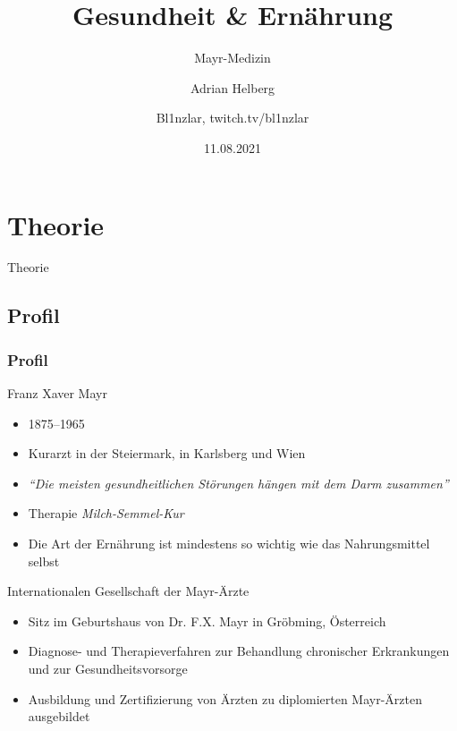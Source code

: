 \documentclass[xcolor=dvipsnames]{beamer}
\title{Gesundheit \& Ernährung}
\subtitle{Mayr-Medizin}
\author{Adrian Helberg}
\author{Bl1nzlar, twitch.tv/bl1nzlar}
\date{11.08.2021}
\begin{document}
    \maketitle


    \section{Theorie}
    {
    \begin{frame}
        \begin{center}
            \Huge Theorie
        \end{center}
    \end{frame}
    }

    \subsection{Profil}
    \begin{frame}[allowframebreaks]
        \frametitle{Profil}

        \begin{block}{Franz Xaver Mayr}
            \begin{itemize}
                \setlength\itemsep{1em}
                \item 1875–1965
                \item Kurarzt in der Steiermark, in Karlsberg und Wien
                \item \textit{"`Die meisten gesundheitlichen Störungen hängen mit dem Darm zusammen"'}
                \item Therapie \textit{Milch-Semmel-Kur}
                \item Die Art der Ernährung ist mindestens so wichtig wie das Nahrungsmittel selbst
            \end{itemize}
        \end{block}

        \famebreak

        \begin{block}{Internationalen Gesellschaft der Mayr-Ärzte}
            \begin{itemize}
                \setlength\itemsep{1em}
                \item Sitz im Geburtshaus von Dr. F.X. Mayr in Gröbming, Österreich
                \item Diagnose- und Therapieverfahren zur Behandlung chronischer Erkrankungen und zur Gesundheitsvorsorge
                \item Ausbildung und Zertifizierung von Ärzten zu diplomierten Mayr-Ärzten ausgebildet
            \end{itemize}
        \end{block}
    \end{frame}
\end{document}
